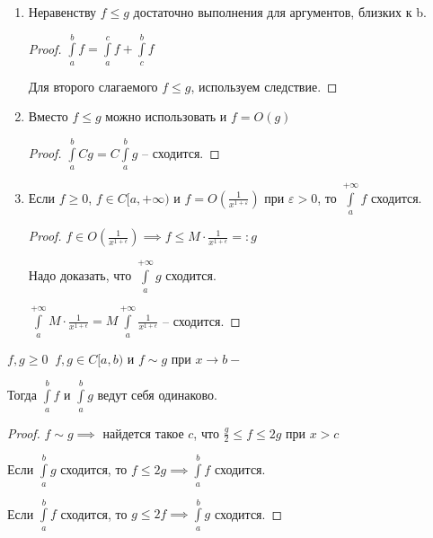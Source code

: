 \begin{remark}
    \begin{enumerate}
    
        \item Неравенству $f \le g$ достаточно выполнения для аргументов, близких к b.
        \begin{proof} \thmslashn
            $\int\limits_{a}^{b} f = \int\limits_{a}^{c} f + \int\limits_{c}^{b} f$
    
            Для второго слагаемого $f \le g$, используем следствие.
        \end{proof}
    
        \item Вместо $f \le g$ можно использовать и $f = O(g)$
        \begin{proof} \thmslashn
            $\int\limits_{a}^{b} Cg = C \int\limits_{a}^{b} g $ -- сходится.
        \end{proof}
    
        \item Если $f \ge 0$, $f \in C[a,+\infty)$ и $f = O(\frac1{x^{1+\varepsilon}})$ при $\varepsilon > 0$, то $\int\limits_{a}^{+\infty} f $ сходится.
        \begin{proof} \thmslashn
            $f \in O(\frac1{x^{1+\epsilon}}) \implies f \le M\cdot \frac1{x^{1+\epsilon}} =: g$
			
			Надо доказать, что $\int\limits_a^{+\infty} g$ сходится.
			
			$\int\limits_a^{+\infty}  M\cdot \frac1{x^{1+\epsilon}} = M\int\limits_a^{+\infty} \frac1{x^{1+\epsilon}}$ -- сходится.

        \end{proof}
    \end{enumerate}

\end{remark}

\begin{consequence} \thmslashn
    $f, g \ge 0 \;\; f,g \in C[a,b)$ и $f \sim g$ при $x \to b-$
		
    Тогда $\int\limits_a^b f$ и $\int\limits_a^b g$ ведут себя одинаково.

\end{consequence}

\begin{proof} \thmslashn
    $f \sim g \implies$ найдется такое $c$, что $\frac{g}{2} \le f \le 2g$ при $x > c$

    Если $\int\limits_{a}^{b} g $ сходится, то $f \le 2g \implies \int\limits_{a}^{b} f$ сходится.

    Если $\int\limits_{a}^{b} f $ сходится, то $g \le 2f \implies \int\limits_{a}^{b} g$ сходится.
\end{proof}

